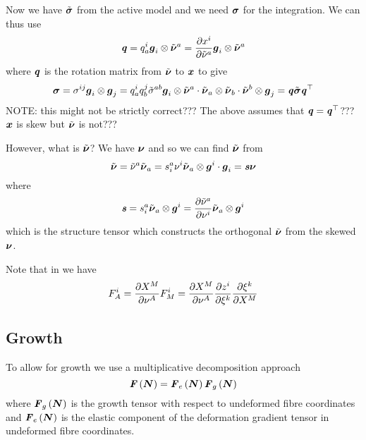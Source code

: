 Now we have $\tilde{\boldsymbol{\mathit{\sigma}}}$ from the active model and we need
$\boldsymbol{\mathit{\sigma}}$ for the integration. We can thus use
\begin{equation}
  \boldsymbol{\mathit{q}}=q^{i}_{a} \boldsymbol{g}_{i} \otimes \tilde{\boldsymbol{\nu}}^{a} = \dfrac{\partial x^{i}}{\partial \tilde{\nu}^{a}}  \boldsymbol{g}_{i} \otimes \tilde{\boldsymbol{\nu}}^{a} 
\end{equation}
where $\boldsymbol{\mathit{q}}$ is the rotation matrix from $\tilde{\boldsymbol{\nu}}$ to
$\boldsymbol{x}$ to give
\begin{equation}
  \boldsymbol{\mathit{\sigma}}=\sigma^{ij} \boldsymbol{g}_{i} \otimes \boldsymbol{g}_{j} =q^{i}_{a}q^{j}_{b}\tilde{\sigma}^{ab}   \boldsymbol{g}_{i} \otimes \tilde{\boldsymbol{\nu}}^{a}   \cdot   \tilde{\boldsymbol{\nu}}_{a} \otimes \tilde{\boldsymbol{\nu}}_{b}    \cdot   \tilde{\boldsymbol{\nu}}^{b} \otimes \boldsymbol{g}_{j}  =\boldsymbol{\mathit{q}}\tilde{\boldsymbol{\mathit{\sigma}}} {\boldsymbol{\mathit{q}}}^{ \top } 
\end{equation}
NOTE: this might not be strictly correct??? The above assumes that
$\boldsymbol{\mathit{q}}= {\boldsymbol{\mathit{q}}}^{ \top } $??? $\boldsymbol{x}$ is skew but
$\tilde{\boldsymbol{\nu}}$ is not???

However, what is $\tilde{\boldsymbol{\nu}}$? We have $\boldsymbol{\nu}$ and so we can
find $\tilde{\boldsymbol{\nu}}$ from
\begin{equation}
  \tilde{\boldsymbol{\nu}}=\tilde{\nu}^{a}\tilde{\boldsymbol{\nu}}_{a}=s^{a}_{i}\nu^{i}  \tilde{\boldsymbol{\nu}}_{a} \otimes \boldsymbol{g}^{i}   \cdot  \boldsymbol{g}_{i} =\boldsymbol{\mathit{s}}\boldsymbol{\nu}
\end{equation}
where
\begin{equation}
  \boldsymbol{\mathit{s}}=s^{a}_{i} \tilde{\boldsymbol{\nu}}_{a} \otimes \boldsymbol{g}^{i} = \dfrac{\partial \tilde{\nu}^{a}}{\partial \nu^{i}}  \tilde{\boldsymbol{\nu}}_{a} \otimes \boldsymbol{g}^{i} 
\end{equation}
which is the structure tensor which constructs the orthogonal
$\tilde{\boldsymbol{\nu}}$ from the skewed $\boldsymbol{\nu}$.

Note that in \OpenCMISS we have
\begin{equation}
  F^{i}_{A}= \dfrac{\partial X^{M}}{\partial \nu^{A}} F^{i}_{M}= \dfrac{\partial X^{M}}{\partial \nu^{A}}  \dfrac{\partial z^{i}}{\partial \xi^{k}}  \dfrac{\partial \xi^{k}}{\partial X^{M}} 
\end{equation}

\subsection{Growth}

To allow for growth we use a multiplicative decomposition approach \ie
\begin{equation}
   \boldsymbol{\mathit{F}}\left( \boldsymbol{N} \right) = \boldsymbol{\mathit{F}}_{e}\left( \boldsymbol{N} \right)  \boldsymbol{\mathit{F}}_{g}\left( \boldsymbol{N} \right) 
\end{equation}
where $ \boldsymbol{\mathit{F}}_{g}\left( \boldsymbol{N} \right) $ is the growth tensor with
respect to undeformed fibre coordinates and $ \boldsymbol{\mathit{F}}_{e}\left( \boldsymbol{N} \right) $ is the
elastic component of the deformation gradient tensor in undeformed fibre coordinates.

